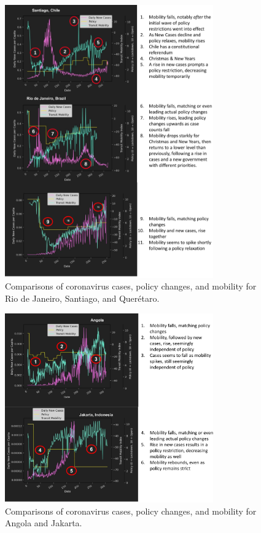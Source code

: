 \begin{figure}[!htb]
\centering
\includegraphics[width=0.8\textwidth]{Figures/chap5/mobility-graphs-rio-santiago.png}
\caption[Mobility, COVID, \& policy in Rio de Janeiro, Santiago, and Querétaro]{Comparisons of coronavirus cases, policy changes, and mobility for Rio de Janeiro, Santiago, and Querétaro.}
\label{fig:mobility-graphs-rio-santiago}
\end{figure}

\begin{figure}[!htb]
\centering
\includegraphics[width=0.8\textwidth]{Figures/chap5/mobility-graphs-angola-jakarta.png}
\caption[Mobility, COVID, \& policy in Angola and Jakarta]{Comparisons of coronavirus cases, policy changes, and mobility for Angola and Jakarta.}
\label{fig:mobility-graphs-angola-jakarta}
\end{figure}

